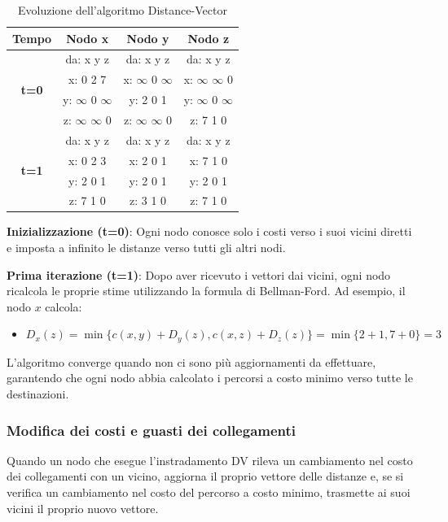 \begin{table}[H]
\centering
\caption{Evoluzione dell'algoritmo Distance-Vector}
\begin{tabular}{|c|c|c|c|}
\hline
\textbf{Tempo} & \textbf{Nodo x} & \textbf{Nodo y} & \textbf{Nodo z} \\
\hline
\multirow{4}{*}{\textbf{t=0}} & da: x y z & da: x y z & da: x y z \\
 & x: 0 2 7 & x: $\infty$ 0 $\infty$ & x: $\infty$ $\infty$ 0 \\
 & y: $\infty$ 0 $\infty$ & y: 2 0 1 & y: $\infty$ 0 $\infty$ \\
 & z: $\infty$ $\infty$ 0 & z: $\infty$ $\infty$ 0 & z: 7 1 0 \\
\hline
\multirow{4}{*}{\textbf{t=1}} & da: x y z & da: x y z & da: x y z \\
 & x: 0 2 3 & x: 2 0 1 & x: 7 1 0 \\
 & y: 2 0 1 & y: 2 0 1 & y: 2 0 1 \\
 & z: 7 1 0 & z: 3 1 0 & z: 7 1 0 \\
\hline
\end{tabular}
\end{table}

\textbf{Inizializzazione (t=0)}: Ogni nodo conosce solo i costi verso i suoi vicini diretti e imposta a infinito le distanze verso tutti gli altri nodi.

\textbf{Prima iterazione (t=1)}: Dopo aver ricevuto i vettori dai vicini, ogni nodo ricalcola le proprie stime utilizzando la formula di Bellman-Ford. Ad esempio, il nodo $x$ calcola:
\begin{itemize}
  \item $D_x(z) = \min\{c(x,y) + D_y(z), c(x,z) + D_z(z)\} = \min\{2+1, 7+0\} = 3$
\end{itemize}

L'algoritmo converge quando non ci sono più aggiornamenti da effettuare, garantendo che ogni nodo abbia calcolato i percorsi a costo minimo verso tutte le destinazioni.

\subsubsection*{Modifica dei costi e guasti dei collegamenti}
Quando un nodo che esegue l'instradamento DV rileva un cambiamento nel costo dei collegamenti con un vicino, aggiorna il proprio vettore delle distanze e, se si verifica un cambiamento nel costo del percorso a costo minimo, trasmette ai suoi vicini il proprio nuovo vettore.

